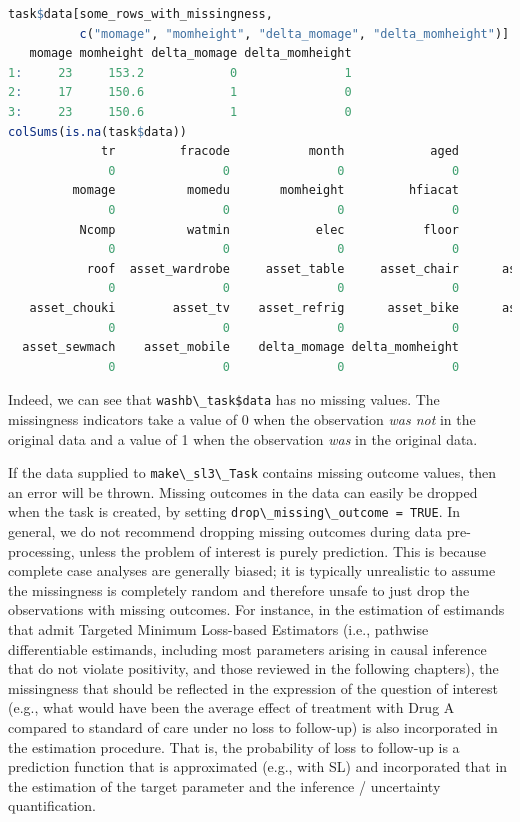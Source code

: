 \documentclass[
  12pt, krantz2,
]{krantz}
\newcommand{\passthrough}[1]{#1}
\newcommand{\1}{\mathbbm{1}}
\theoremstyle{definition}
\theoremstyle{definition}
\theoremstyle{definition}
\theoremstyle{definition}
\theoremstyle{remark}
\begin{document}
\begin{lstlisting}[language=R]
task$data[some_rows_with_missingness,
          c("momage", "momheight", "delta_momage", "delta_momheight")]
   momage momheight delta_momage delta_momheight
1:     23     153.2            0               1
2:     17     150.6            1               0
3:     23     150.6            1               0
colSums(is.na(task$data))
             tr         fracode           month            aged             sex 
              0               0               0               0               0 
         momage          momedu       momheight         hfiacat           Nlt18 
              0               0               0               0               0 
          Ncomp          watmin            elec           floor           walls 
              0               0               0               0               0 
           roof  asset_wardrobe     asset_table     asset_chair      asset_khat 
              0               0               0               0               0 
   asset_chouki        asset_tv    asset_refrig      asset_bike      asset_moto 
              0               0               0               0               0 
  asset_sewmach    asset_mobile    delta_momage delta_momheight             whz 
              0               0               0               0               0 
\end{lstlisting}

Indeed, we can see that \passthrough{\lstinline!washb\_task$data!} has no missing values. The missingness
indicators take a value of 0 when the observation \emph{was not} in the original data
and a value of 1 when the observation \emph{was} in the original data.

If the data supplied to \passthrough{\lstinline!make\_sl3\_Task!} contains missing outcome values, then an
error will be thrown. Missing outcomes in the data can easily be dropped when
the task is created, by setting \passthrough{\lstinline!drop\_missing\_outcome = TRUE!}. In general, we do
not recommend dropping missing outcomes during data pre-processing, unless the
problem of interest is purely prediction. This is because complete case analyses
are generally biased; it is typically unrealistic to assume the missingness is
completely random and therefore unsafe to just drop the observations with
missing outcomes. For instance, in the estimation of estimands that admit
Targeted Minimum Loss-based Estimators (i.e., pathwise differentiable estimands,
including most parameters arising in causal inference that do not violate
positivity, and those reviewed in the following chapters), the missingness that
should be reflected in the expression of the question of interest (e.g., what
would have been the average effect of treatment with Drug A compared to standard
of care under no loss to follow-up) is also incorporated in the estimation
procedure. That is, the probability of loss to follow-up is a prediction
function that is approximated (e.g., with SL) and incorporated that in the
estimation of the target parameter and the inference / uncertainty
quantification.
\end{document}
